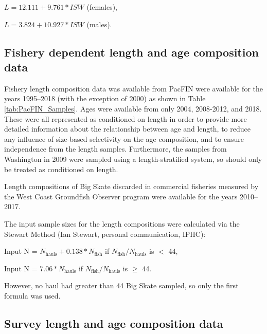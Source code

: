 \documentclass[12pt,]{article}
\begin{document}
\begin{centering}

$L = 12.111 + 9.761*ISW$ (females),

$L = 3.824 + 10.927*ISW$ (males).

\end{centering}

\hypertarget{fishery-dependent-length-and-age-composition-data}{%
\subsection{Fishery dependent length and age composition
data}\label{fishery-dependent-length-and-age-composition-data}}

Fishery length composition data was available from PacFIN were available
for the years 1995--2018 (with the exception of 2000) as shown in Table
\ref{tab:PacFIN_Samples}. Ages were available from only 2004, 2008-2012,
and 2018. These were all represented as conditioned on length in order
to provide more detailed information about the relationship between age
and length, to reduce any influence of size-based selectivity on the age
composition, and to ensure independence from the length samples.
Furthermore, the samples from Washington in 2009 were sampled using a
length-stratified system, so should only be treated as conditioned on
length.

Length compositions of Big Skate discarded in commercial fisheries
measured by the West Coast Groundfish Observer program were available
for the years 2010--2017.

The input sample sizes for the length compositions were calculated via
the Stewart Method (Ian Stewart, personal communication, IPHC):

\begin{centering}

Input N = $N_{\text{hauls}} + 0.138 * N_{\text{fish}}$ if $N_{\text{fish}}/N_{\text{hauls}}$ is $<$ 44,

Input N = $7.06 * N_{\text{hauls}}$ if $N_{\text{fish}}/N_{\text{hauls}}$ is $\geq$ 44.

\end{centering}

However, no haul had greater than 44 Big Skate sampled, so only the
first formula was used.

\hypertarget{survey-length-and-age-composition-data}{%
\subsection{Survey length and age composition
data}\label{survey-length-and-age-composition-data}}
\end{document}
